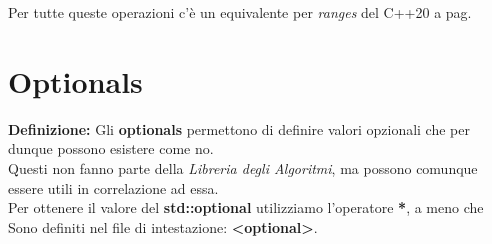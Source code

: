 \fleuron

\textsf{\small Per tutte queste operazioni c'è un equivalente per \emph{ranges} del C++20 a pag. \pageref{ranges}} \\


\newpage

\section{Optionals}

\textsf{\small \textbf{Definizione: } Gli \textbf{optionals} permettono di definire valori opzionali che per dunque possono esistere come no.} \\

\textsf{\small Questi non fanno parte della \emph{Libreria degli Algoritmi}, ma possono comunque essere utili in correlazione ad essa.} \\

\textsf{\small Per ottenere il valore del \textbf{std::optional} utilizziamo l'operatore \textbf{*}, a meno che } \\

\textsf{\small Sono definiti nel file di intestazione: \textbf{<optional>}.} \\

